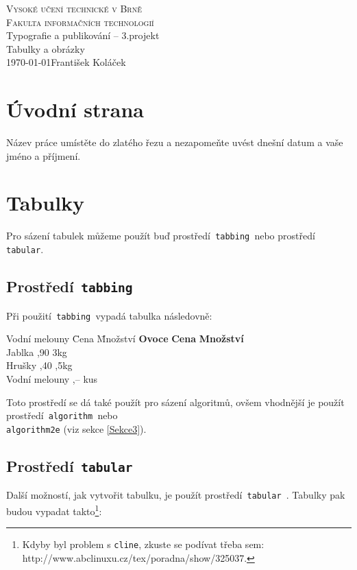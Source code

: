 \documentclass[a4paper, 11pt]{article}
\begin{document}
\begin{titlepage}
\begin{center}
\Huge
\textsc{Vysoké učení technické v Brně}\\
\huge
\textsc{Fakulta informačních technologií}\\
\LARGE
Typografie a publikování -- 3.projekt\\
\Huge
Tabulky a obrázky\\
\Large
\today\hfill František Koláček
\end{center}
\end{titlepage}

\section{Úvodní strana}
Název práce umístěte do zlatého řezu a nezapomeňte uvést dnešní datum a vaše jméno a příjmení.

\section{Tabulky}
Pro sázení tabulek můžeme použít buď prostředí\verb| tabbing |nebo prostředí\verb| tabular|.

	\subsection{Prostředí\texttt{ tabbing }}
	Při použití\verb| tabbing |vypadá tabulka následovně:

	\begin{tabbing}
	Vodní melouny \qquad \= Cena \qquad \= Množství\kill
	\textbf{Ovoce} \> \textbf{Cena} \> \textbf{Množství} \\
	Jablka ,90 \> 3kg \\
	Hrušky ,40 ,5kg\\
	Vodní melouny ,--  kus\\
	\end{tabbing}
Toto prostředí se dá také použít pro sázení algoritmů, ovšem vhodnější je použít prostředí\verb| algorithm |nebo \\\verb|algorithm2e| (viz sekce \ref{Sekce3}).

\subsection{Prostředí\texttt{ tabular }}
Další možností, jak vytvořit tabulku, je použít prostředí\texttt{ tabular }. Tabulky pak budou vypadat takto\footnote{Kdyby byl problem s \texttt{cline}, zkuste se podívat třeba sem: http://www.abclinuxu.cz/tex/poradna/show/325037.}:
\end{document}
